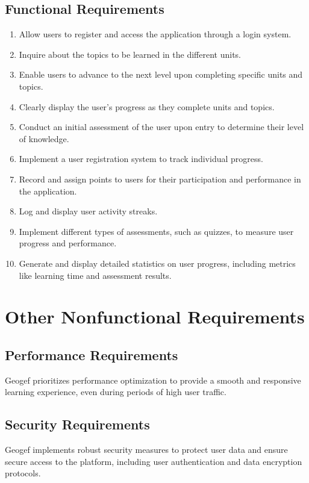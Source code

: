 \documentclass{scrreprt}
\begin{document}
\section{Functional Requirements}
\begin{enumerate}
    \item Allow users to register and access the application through a login system.
    \item Inquire about the topics to be learned in the different units.
    \item Enable users to advance to the next level upon completing specific units and topics.
    \item Clearly display the user's progress as they complete units and topics.
    \item Conduct an initial assessment of the user upon entry to determine their level of knowledge.
    \item Implement a user registration system to track individual progress.
    \item Record and assign points to users for their participation and performance in the application.
    \item Log and display user activity streaks.
    \item Implement different types of assessments, such as quizzes, to measure user progress and performance.
    \item  Generate and display detailed statistics on user progress, including metrics like learning time and assessment results.
\end{enumerate}

\chapter{Other Nonfunctional Requirements}

\section{Performance Requirements}
Geogef prioritizes performance optimization to provide a smooth and responsive learning experience, even during periods of high user traffic.

\section{Security Requirements}
Geogef implements robust security measures to protect user data and ensure secure access to the platform, including user authentication and data encryption protocols.
\end{document}
